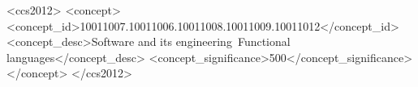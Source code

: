 \documentclass[acmsmall,screen,nonacm]{acmart}
\theoremstyle{slplain}
\numberwithin{thm}{section}
\begin{document}



\begin{CCSXML}
<ccs2012>
<concept>
<concept_id>10011007.10011006.10011008.10011009.10011012</concept_id>
<concept_desc>Software and its engineering~Functional languages</concept_desc>
<concept_significance>500</concept_significance>
</concept>
</ccs2012>
\end{CCSXML}





\maketitle




% 





\ifarxiv
\clearpage
\appendix


\else

\fi
% 
% 
\end{document}

